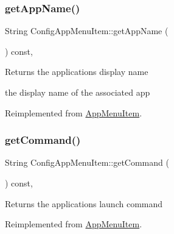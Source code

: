 \subsubsection{\texorpdfstring{get\+App\+Name()}{getAppName()}}
{\footnotesize\ttfamily String Config\+App\+Menu\+Item\+::get\+App\+Name (\begin{DoxyParamCaption}{ }\end{DoxyParamCaption}) const\hspace{0.3cm}{\ttfamily [override]}, {\ttfamily [virtual]}}

\begin{DoxyReturn}{Returns}
the application\textquotesingle{}s display name

the display name of the associated app 
\end{DoxyReturn}


Reimplemented from \mbox{\hyperlink{classAppMenuItem_aef18401da6511ac234ccbb2d2131fcad}{App\+Menu\+Item}}.

\mbox{\label{classConfigAppMenuItem_ada51b274c9d790f1bf5f9e84f878f0a4}} 
\subsubsection{\texorpdfstring{get\+Command()}{getCommand()}}
{\footnotesize\ttfamily String Config\+App\+Menu\+Item\+::get\+Command (\begin{DoxyParamCaption}{ }\end{DoxyParamCaption}) const\hspace{0.3cm}{\ttfamily [override]}, {\ttfamily [virtual]}}

\begin{DoxyReturn}{Returns}
the application\textquotesingle{}s launch command 
\end{DoxyReturn}


Reimplemented from \mbox{\hyperlink{classAppMenuItem_ab56357ca864c4cedc9caed1118498670}{App\+Menu\+Item}}.

\mbox{\label{classConfigAppMenuItem_a5dd3db4741768d444af41adc11b36cde}} 
